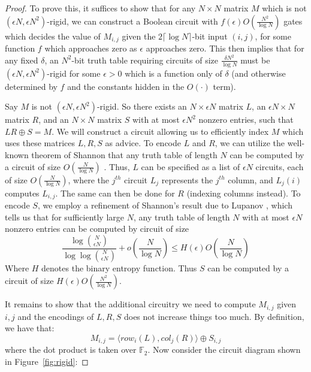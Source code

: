 \documentclass[11pt]{article}
\begin{document}
\begin{proof}
To prove this, it suffices to show that for any $N \times N$ matrix $M$ which is not $(\epsilon N, \epsilon N^2)$-rigid, we can construct a Boolean circuit with $f(\epsilon)O(\frac{N^2}{\log N})$ gates which decides the value of $M_{i,j}$ given the $2\lceil \log N \rceil$-bit input $(i,j)$, for some function $f$ which approaches zero as $\epsilon$ approaches zero. This then implies that for any fixed $\delta$, an $N^2$-bit truth table requiring circuits of size $\frac{\delta N^2}{\log N}$ must be $(\epsilon N, \epsilon N^2)$-rigid  for some $\epsilon > 0$ which is a function only of $\delta$ (and otherwise determined by $f$ and the constants hidden in the $O(\cdot)$ term).

Say $M$ is not $(\epsilon N, \epsilon N^2)$-rigid. So there exists an $N \times \epsilon N$ matrix $L$, an $\epsilon N \times N$ matrix $R$, and an $N \times N$ matrix $S$ with at most $\epsilon N^2$ nonzero entries, such that $LR \oplus S = M$. We will construct a circuit allowing us to efficiently index $M$ which uses these matrices $L, R, S$ as advice. To encode $L$ and $R$, we can utilize the well-known theorem of Shannon that any truth table of length $N$ can be computed by a circuit of size $O(\frac{N}{\log N})$ \cite{Shannon}. Thus, $L$ can be specified as a list of $\epsilon N$ circuits, each of size $O(\frac{N}{\log N})$, where the $j^{th}$ circuit $L_j$ represents the $j^{th}$ column, and $L_j(i)$ computes $L_{i,j}$. The same can then be done for $R$ (indexing columns instead). To encode $S$, we employ a refinement of Shannon's result due to Lupanov \cite{Coin-Problem}, which tells us that for sufficiently large $N$, any truth table of length $N$ with at most $\epsilon N$ nonzero entries can be computed by circuit of size
\[
\frac{\log\binom{N}{\epsilon N}}{\log \log \binom{N}{\epsilon N}} + o\left(\frac{N}{\log N}\right) \leq H(\epsilon) O(\frac{N}{\log N})
\]
Where $H$ denotes the binary entropy function. Thus $S$ can be computed by a circuit of size $H(\epsilon) O(\frac{N^2}{\log N})$.

It remains to show that the additional circuitry we need to compute $M_{i,j}$ given $i, j$ and the encodings of $L,R,S$ does not increase things too much. By definition, we have that: 
\[M_{i,j} = \langle row_i(L), col_j(R) \rangle \oplus S_{i,j}\]
where the dot product is taken over $\mathbb{F}_2$. Now consider the circuit diagram shown in Figure~\ref{fig:rigid}:


\end{proof}
\end{document}
